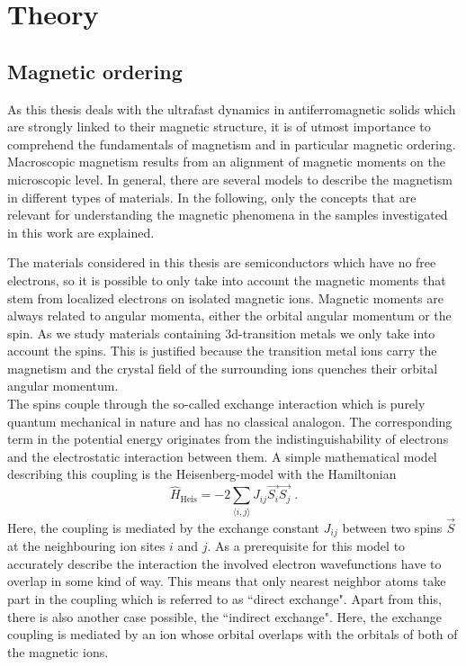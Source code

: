 \chapter{Theory}

\section{Magnetic ordering}
As this thesis deals with the ultrafast dynamics in antiferromagnetic solids which are strongly linked to their magnetic structure, it is of utmost importance to comprehend the fundamentals of magnetism and in particular magnetic ordering.
Macroscopic magnetism results from an alignment of magnetic moments on the microscopic level.
In general, there are several models to describe the magnetism in different types of materials.
In the following, only the concepts that are relevant for understanding the magnetic phenomena in the samples investigated in this work are explained.

The materials considered in this thesis are semiconductors which have no free electrons, so it is possible to only take into account the magnetic moments that stem from localized electrons on isolated magnetic ions.
Magnetic moments are always related to angular momenta, either the orbital angular momentum or the spin.
As we study materials containing 3d-transition metals we only take into account the spins.
This is justified because the transition metal ions carry the magnetism and the crystal field of the surrounding ions quenches their orbital angular momentum. \\
The spins couple through the so-called exchange interaction which is purely quantum mechanical in nature and has no classical analogon.
The corresponding term in the potential energy originates from the indistinguishability of electrons and the electrostatic interaction between them.
A simple mathematical model describing this coupling is the Heisenberg-model with the Hamiltonian
\begin{equation}
    \hat{H}_{\text{Heis}} = -2 \sum_{\langle i,j \rangle} J_{ij} \vec{S_i} \vec{S_j} \;.
\end{equation}
Here, the coupling is mediated by the exchange constant $J_{ij}$ between two spins $\vec{S}$ at the neighbouring ion sites $i$ and $j$.
As a prerequisite for this model to accurately describe the interaction the involved electron wavefunctions have to overlap in some kind of way.
This means that only nearest neighbor atoms take part in the coupling which is referred to as ``direct exchange".
Apart from this, there is also another case possible, the ``indirect exchange".
Here, the exchange coupling is mediated by an ion whose orbital overlaps with the orbitals of both of the magnetic ions.

